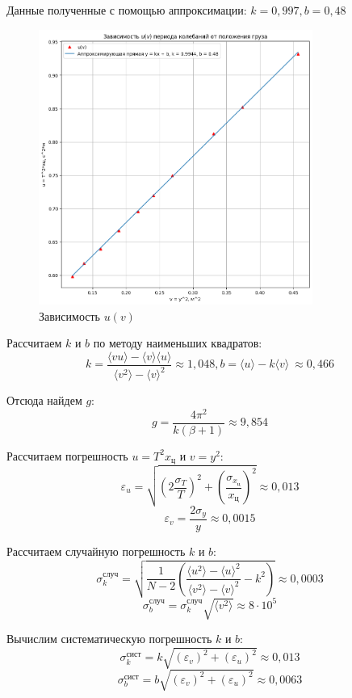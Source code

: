 \documentclass[a4paper]{article}
\begin{document}
Данные полученные с помощью аппроксимации: $k = 0,997, b = 0,48$ 
\begin{figure}[t]
    \centering
    \includegraphics[width=0.8\textwidth]{graphic2}
    \caption{Зависимость $u(v)$}
\end{figure}

Рассчитаем $k$ и $b$ по методу наименьших квадратов:
\[k = \frac{\langle vu \rangle - \langle v \rangle \langle u \rangle}{\langle v^2 \rangle - \langle v \rangle^2} \approx 1,048, b = \langle u \rangle - k \langle v \rangle\ \approx 0,466\]

Отсюда найдем $g$:
\[g = \frac{4\pi^2}{k \left( \beta + 1\right)} \approx 9,854\]

Рассчитаем погрешность $u = T^2 x_{\text{ц}}$ и $v = y^2$:
\[\varepsilon_{u} = \sqrt{\left( 2\frac{\sigma_{T}}{T}\right)^2 + \left( \frac{\sigma_{x_{\text{ц}}}}{x_{\text{ц}}}\right)^2} \approx 0,013\]
\[\varepsilon_{v} = \frac{2\sigma_{y}}{y} \approx 0,0015\]


Рассчитаем случайную погрешность $k$ и $b$:
\[\sigma_{k}^{\text{случ}} = \sqrt{\frac{1}{N-2}\left( \frac{\langle u^2 \rangle - \langle u \rangle^2}{\langle v^2 \rangle - \langle v \rangle^2} - k^2\right)} \approx 0,0003\]
\[\sigma_{b}^{\text{случ}} = \sigma_{k}^{\text{случ}}\sqrt{\langle v^2 \rangle} \approx 8 \cdot 10^5\]

Вычислим систематическую погрешность $k$ и $b$:
\[\sigma_{k}^{\text{сист}} = k\sqrt{(\varepsilon_{v})^2 + (\varepsilon_{u})^2} \approx 0,013\]
\[\sigma_{b}^{\text{сист}} = b\sqrt{(\varepsilon_{v})^2 + (\varepsilon_{u})^2} \approx 0,0063\]
\end{document}
